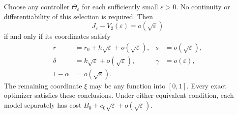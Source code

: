 \begin{theorem}
\label{thm:dot-first-order-controller-rigidity}
Choose any controller $\Theta_\varepsilon$ for each sufficiently
small $\varepsilon>0$.  No continuity or differentiability of this
selection is required.  Then
\begin{equation}\label{eq:dot-near-optimal-scale}
 J_\varepsilon-V_2(\varepsilon)=o(\sqrt\varepsilon)
\end{equation}
if and only if its coordinates satisfy
\begin{align}
 r&=r_0+h\sqrt\varepsilon+o(\sqrt\varepsilon),
 &s&=o(\sqrt\varepsilon),\nonumber\\
 \delta&=k\sqrt\varepsilon+o(\sqrt\varepsilon),
 &\gamma&=o(\varepsilon),\nonumber\\
 1-\alpha&=o(\sqrt\varepsilon).
 &&\label{eq:dot-optimal-controller-scales}
\end{align}
The remaining coordinate $\xi$ may be any function into $[0,1]$.
Every exact optimizer satisfies these conclusions.  Under either
equivalent condition, each model separately has cost
$B_0+c_0\sqrt\varepsilon+o(\sqrt\varepsilon)$.
\end{theorem}
